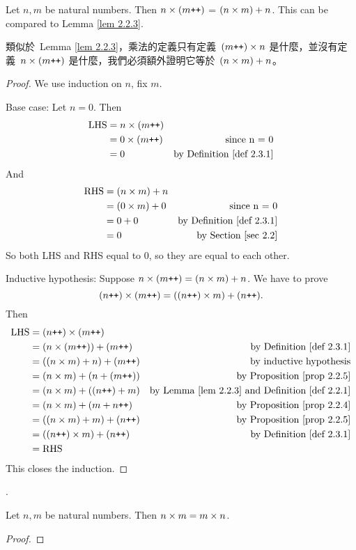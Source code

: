 \begin{additional corollary} \label{ac 2.3.3}
Let \(n, m\) be natural numbers. Then \(n \times (m\texttt{++})\) = \((n \times m) + n\). This can be compared to Lemma \ref{lem 2.2.3}.
\end{additional corollary}
\begin{note}
類似於\ Lemma \ref{lem 2.2.3}，乘法的定義只有定義\ \((m\texttt{++}) \times n\) 是什麼，並沒有定義\ \(n \times (m\texttt{++})\) 是什麼，我們必須額外證明它等於\ \((n \times m) + n\)。
\end{note}
\begin{proof}
We use induction on \(n\), fix \(m\).

Base case: Let \(n = 0\). Then
\begin{align*}
    \text{LHS} & = n \times (m\texttt{++}) \\
               & = 0 \times (m\texttt{++}) & \text{since n = 0} \\
               & = 0 & \text{by Definition \ref{def 2.3.1}}
\end{align*}
And
\begin{align*}
    \text{RHS} & = (n \times m) + n \\
               & = (0 \times m) + 0 & \text{since n = 0} \\
               & = 0 + 0 & \text{by Definition \ref{def 2.3.1}} \\
               & = 0 & \text{by Section \ref{sec 2.2}}
\end{align*}
So both LHS and RHS equal to \(0\), so they are equal to each other.

Inductive hypothesis: Suppose \(n \times (m\texttt{++}) = (n \times m) + n\). We have to prove
\[(n\texttt{++}) \times (m\texttt{++}) = ((n\texttt{++}) \times m) + (n\texttt{++}).\]
Then
\begin{align*}
    \text{LHS} & = (n\texttt{++}) \times (m\texttt{++}) \\
               & = (n \times (m\texttt{++})) + (m\texttt{++}) & \text{by Definition \ref{def 2.3.1}} \\
               & = ((n \times m) + n) + (m\texttt{++}) & \text{by inductive hypothesis} \\
               & = (n \times m) + (n + (m\texttt{++})) & \text{by Proposition \ref{prop 2.2.5}} \\
               & = (n \times m) + ((n\texttt{++}) + m) & \text{by Lemma \ref{lem 2.2.3} and Definition \ref{def 2.2.1}} \\
               & = (n \times m) + (m + n\texttt{++}) & \text{by Proposition \ref{prop 2.2.4}} \\
               & = ((n \times m) + m) + (n\texttt{++}) & \text{by Proposition \ref{prop 2.2.5}} \\
               & = ((n\texttt{++}) \times m) + (n\texttt{++}) & \text{by Definition \ref{def 2.3.1}} \\
               & = \text{RHS}
\end{align*}
This closes the induction.
\end{proof}.

\begin{lemma}\label{lem 2.3.2}
Let \(n, m\) be natural numbers. Then \(n \times m = m \times n\).
\end{lemma}
\begin{proof}

\end{proof}